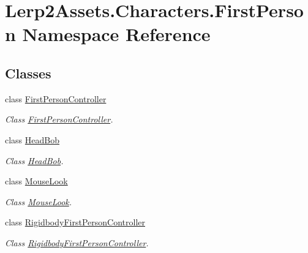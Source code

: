 \hypertarget{namespace_lerp2_assets_1_1_characters_1_1_first_person}{}\section{Lerp2\+Assets.\+Characters.\+First\+Person Namespace Reference}
\label{namespace_lerp2_assets_1_1_characters_1_1_first_person}
\subsection*{Classes}
\begin{DoxyCompactItemize}
\item 
class \hyperlink{class_lerp2_assets_1_1_characters_1_1_first_person_1_1_first_person_controller}{First\+Person\+Controller}
\begin{DoxyCompactList}\small\item\em Class \hyperlink{class_lerp2_assets_1_1_characters_1_1_first_person_1_1_first_person_controller}{First\+Person\+Controller}. \end{DoxyCompactList}\item 
class \hyperlink{class_lerp2_assets_1_1_characters_1_1_first_person_1_1_head_bob}{Head\+Bob}
\begin{DoxyCompactList}\small\item\em Class \hyperlink{class_lerp2_assets_1_1_characters_1_1_first_person_1_1_head_bob}{Head\+Bob}. \end{DoxyCompactList}\item 
class \hyperlink{class_lerp2_assets_1_1_characters_1_1_first_person_1_1_mouse_look}{Mouse\+Look}
\begin{DoxyCompactList}\small\item\em Class \hyperlink{class_lerp2_assets_1_1_characters_1_1_first_person_1_1_mouse_look}{Mouse\+Look}. \end{DoxyCompactList}\item 
class \hyperlink{class_lerp2_assets_1_1_characters_1_1_first_person_1_1_rigidbody_first_person_controller}{Rigidbody\+First\+Person\+Controller}
\begin{DoxyCompactList}\small\item\em Class \hyperlink{class_lerp2_assets_1_1_characters_1_1_first_person_1_1_rigidbody_first_person_controller}{Rigidbody\+First\+Person\+Controller}. \end{DoxyCompactList}\end{DoxyCompactItemize}
